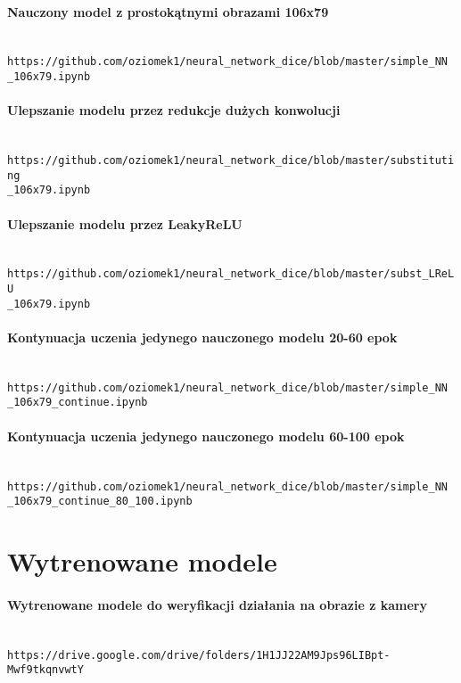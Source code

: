 \paragraph{Nauczony model z prostokątnymi obrazami 106x79} \mbox{}\\
\texttt{https://github.com/oziomek1/neural\_network\_dice/blob/master/simple\_NN\\\_106x79.ipynb}

\paragraph{Ulepszanie modelu przez redukcje dużych konwolucji} \mbox{}\\
\texttt{https://github.com/oziomek1/neural\_network\_dice/blob/master/substituting\\\_106x79.ipynb}

\paragraph{Ulepszanie modelu przez LeakyReLU} \mbox{}\\
\texttt{https://github.com/oziomek1/neural\_network\_dice/blob/master/subst\_LReLU\\\_106x79.ipynb}

\paragraph{Kontynuacja uczenia jedynego nauczonego modelu 20-60 epok} \mbox{}\\
\texttt{https://github.com/oziomek1/neural\_network\_dice/blob/master/simple\_NN\\\_106x79\_continue.ipynb}

\paragraph{Kontynuacja uczenia jedynego nauczonego modelu 60-100 epok} \mbox{}\\
\texttt{https://github.com/oziomek1/neural\_network\_dice/blob/master/simple\_NN\\\_106x79\_continue\_80\_100.ipynb}

\section{Wytrenowane modele}

\paragraph{Wytrenowane modele do weryfikacji działania na obrazie z kamery} \mbox{}\\
\texttt{https://drive.google.com/drive/folders/1H1JJ22AM9Jps96LIBpt-Mwf9tkqnvwtY}


